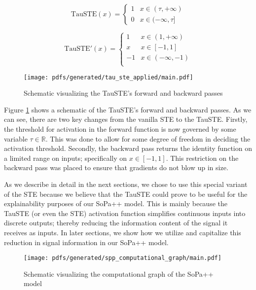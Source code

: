 \begin{equation}
  \label{eq:tau_ste_forward}
  \text{TauSTE}(x)=
  \begin{cases}
    1 & x \in (\tau, +\infty) \\
    0 & x \in (-\infty, \tau]
  \end{cases}
\end{equation}

\begin{equation}
  \label{eq:tau_ste_backward}
  \text{TauSTE}'(x)=
  \begin{cases}
    1 & x \in  (1, +\infty) \\
    x & x \in [-1, 1] \\
    -1 & x \in (-\infty, -1) \\
  \end{cases}
\end{equation}

\begin{figure}[t!]
  \centering
  \texttt{[image: pdfs/generated/tau\_ste\_applied/main.pdf]}
  \caption{Schematic visualizing the TauSTE's forward and backward passes}
  \label{fig:tau_ste}
\end{figure}

Figure \ref{fig:tau_ste} shows a schematic of the TauSTE's forward and backward
passes. As we can see, there are two key changes from the vanilla STE to the
TauSTE. Firstly, the threshold for activation in the forward function is now
governed by some variable $\tau \in \mathbb{R}$. This was done to allow for some degree of freedom
in deciding the activation threshold. Secondly, the backward pass returns the
identity function on a limited range on inputs; specifically on $x \in [-1,1]$.
This restriction on the backward pass was placed to ensure that gradients do not
blow up in size.

As we describe in detail in the next sections, we chose to use this special
variant of the STE because we believe that the TauSTE could prove to be useful
for the explainability purposes of our SoPa++ model. This is mainly because the
TauSTE (or even the STE) activation function simplifies continuous inputs into
discrete outputs; thereby reducing the information content of the signal it
receives as inputs. In later sections, we show how we utilize and capitalize
this reduction in signal information in our SoPa++ model.

\begin{figure}[t!]
  \centering
  \texttt{[image: pdfs/generated/spp\_computational\_graph/main.pdf]}
  \caption{Schematic visualizing the computational graph of the SoPa++ model}
  \label{fig:spp_cg}
\end{figure}

